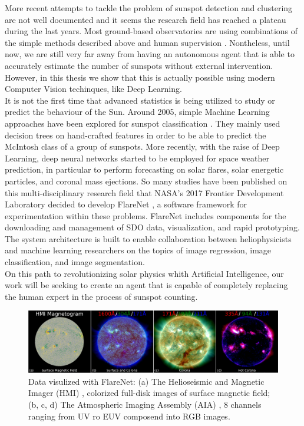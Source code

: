 More recent attempts to tackle the problem of sunspot detection and clustering are not well documented and it seems the research field has reached a plateau during the last years. Most ground-based observatories are using combinations of the simple methods described above and human supervision \cite{pucha2016development}. Nontheless, until now, we are still very far away from having an autonomous agent that is able to accurately estimate the number of sunspots without external intervention. However, in this thesis we show that this is actually possible using modern Computer Vision techinques, like Deep Learning. \\
It is not the first time that advanced statistics is being utilized to study or predict the behaviour of the Sun. Around 2005, simple Machine Learning approaches have been explored for sunspot classification \cite{colak2007automatic}\cite{nguyen2006learning}\cite{nguyen2005rough}. They mainly used decision trees on hand-crafted features in order to be able to predict the McIntosh class of a group of sunspots. More recently, with the raise of Deep Learning, deep neural networks started to be employed for space weather prediction, in particular to perform forecasting on solar flares, solar energetic particles, and coronal mass ejections. So many studies have been published on this multi-disciplinary research field that NASA's 2017 Frontier Development Laboratory decided to develop FlareNet \cite{McGregor2017}, a software framework for experimentation within these problems. FlareNet includes components for the downloading and management of SDO data, visualization, and rapid prototyping. The system architecture is built to enable collaboration between heliophysicists and machine learning researchers on the topics of image regression, image classification, and image segmentation. \\
On this path to revolutionizing solar physics whith Artificial Intelligence, our work will be seeking to create an agent that is capable of completely replacing the human expert in the process of sunspot counting.
\begin{figure}[t]
    \centering
    \includegraphics[width=\textwidth]{./pictures/flarenet}
    \caption{Data visulized with FlareNet: (a) The Helioseismic and Magnetic Imager (HMI) \cite{schou2012design}, colorized full-disk images of surface magnetic field; (b, c, d) The Atmospheric Imaging Assembly (AIA) \cite{lemen2011atmospheric}, 8 channels ranging from UV ro EUV composend into RGB images.}
    \label{fig:flarenet}
\end{figure}
